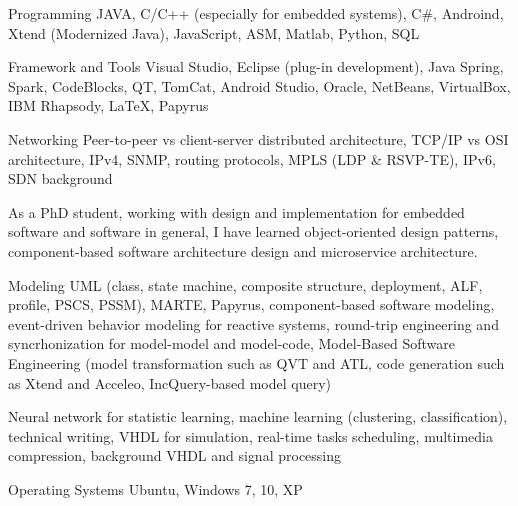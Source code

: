 


\begin{cvskills}

\cvskill
{Programming} %
{JAVA, C/C++ (especially for embedded systems), C\#, Androind, Xtend (Modernized Java), JavaScript, ASM, Matlab, Python, SQL} %

\cvskill
{Framework and Tools} %
{Visual Studio, Eclipse (plug-in development), Java Spring, Spark, CodeBlocks, QT, TomCat, Android Studio, Oracle, NetBeans, VirtualBox, IBM Rhapsody, LaTeX, Papyrus} %



\cvskill
{Networking}
{Peer-to-peer vs client-server distributed architecture, TCP/IP vs OSI architecture, IPv4, SNMP, routing protocols, MPLS (LDP \& RSVP-TE), IPv6, SDN background}


{As a PhD student, working with design and implementation for embedded software and software in general, I have learned object-oriented design patterns, component-based software architecture design and microservice architecture.}


\cvskill
{Modeling}
{UML (class, state machine, composite structure, deployment, ALF, profile, PSCS, PSSM), MARTE, Papyrus, component-based software modeling, event-driven behavior modeling for reactive systems, round-trip engineering and syncrhonization for model-model and model-code, Model-Based Software Engineering (model transformation such as QVT and ATL, code generation  such as Xtend and Acceleo, IncQuery-based model query)}


{Neural network for statistic learning, machine learning (clustering, classification), technical writing, VHDL for simulation, real-time tasks scheduling, multimedia compression, background VHDL and signal processing}


\cvskill
{Operating Systems} %
{Ubuntu, Windows 7, 10, XP} %


\end{cvskills}
